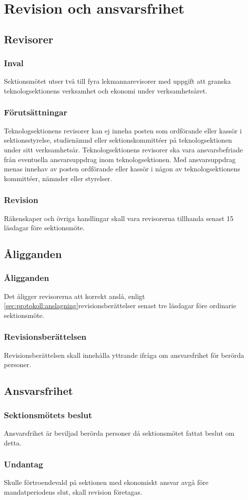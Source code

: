 \section{Revision och ansvarsfrihet}

\subsection{Revisorer}

\subsubsection{Inval}
Sektionsmötet utser två till fyra lekmannarevisorer med uppgift att granska teknologsektionens verksamhet och ekonomi under verksamhetsåret.

\subsubsection{Förutsättningar}
Teknologsektionens revisorer kan ej inneha posten som ordförande eller kassör i sektionsstyrelse, studienämnd eller sektionskommittéer på teknologsektionen under sitt verksamhetsår. Teknologsektionens revisorer ska vara ansvarsbefriade från eventuella ansvarsuppdrag inom teknologsektionen. Med ansvarsuppdrag menas innehav av posten ordförande eller kassör i någon av teknologsektionens kommittéer, nämnder eller styrelser.

\subsubsection{Revision}
Räkenskaper och övriga handlingar skall vara revisorerna tillhanda senast 15 läsdagar före sektionsmöte.

\subsection{Åligganden}

\subsubsection{Åligganden}
Det åligger revisorerna att korrekt anslå, enligt \ref{sec:protokoll:anslagning}revisionsberättelser senast tre läsdagar före ordinarie sektionsmöte.

\subsubsection{Revisionsberättelsen}
Revisionsberättelsen skall innehålla yttrande ifråga om ansvarsfrihet för berörda personer.

\subsection{Ansvarsfrihet}

\subsubsection{Sektionsmötets beslut}
Ansvarsfrihet är beviljad berörda personer då sektionsmötet fattat beslut om detta.

\subsubsection{Undantag}
Skulle förtroendevald på sektionen med ekonomiskt ansvar avgå före mandatperiodens slut, skall revision företagas.